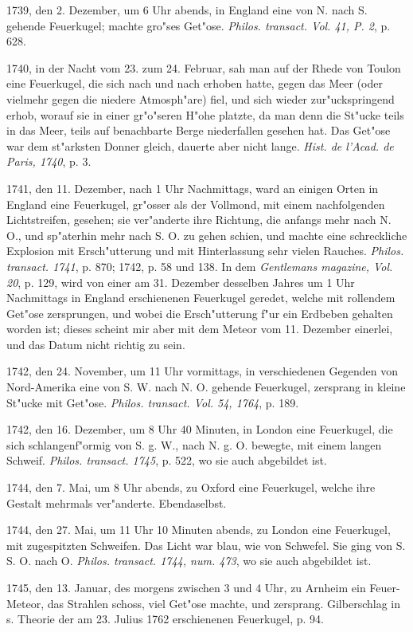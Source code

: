 \documentclass[a4paper, 11pt, oneside, polutonikogreek, german]{article}
\begin{document}
1739, den 2. Dezember, um 6 Uhr abends, in England eine von N. nach S. gehende Feuerkugel; machte gro"ses Get"ose. \emph{Philos. transact. Vol. 41, P. 2}, p. 628.

1740, in der Nacht vom 23. zum 24. Februar, sah man auf der Rhede von Toulon eine Feuerkugel, die sich nach und nach erhoben hatte, gegen das Meer (oder vielmehr gegen die niedere Atmosph"are) fiel, und sich wieder zur"uckspringend erhob, worauf sie in einer gr"o"seren H"ohe platzte, da man denn die St"ucke teils in das Meer, teils auf benachbarte Berge niederfallen gesehen hat. Das Get"ose war dem st"arksten Donner gleich, dauerte aber nicht lange. \emph{Hist. de l'Acad. de Paris, 1740}, p. 3.

1741, den 11. Dezember, nach 1 Uhr Nachmittags, ward an einigen Orten in England eine Feuerkugel, gr"osser als der Vollmond, mit einem nachfolgenden Lichtstreifen, gesehen; sie ver"anderte ihre Richtung, die anfangs mehr nach N. O., und sp"aterhin mehr nach S. O. zu gehen schien, und machte eine schreckliche Explosion mit Ersch"utterung und mit Hinterlassung sehr vielen Rauches. \emph{Philos. transact. 1741}, p. 870; 1742, p. 58 und 138. In dem \emph{Gentlemans magazine, Vol. 20}, p. 129, wird von einer am 31. Dezember desselben Jahres um 1 Uhr Nachmittags in England erschienenen Feuerkugel geredet, welche mit rollendem Get"ose zersprungen, und wobei die Ersch"utterung f"ur ein Erdbeben gehalten worden ist; dieses scheint mir aber mit dem Meteor vom 11. Dezember einerlei, und das Datum nicht richtig zu sein.

1742, den 24. November, um 11 Uhr vormittags, in verschiedenen Gegenden von Nord-Amerika eine von S. W. nach N. O. gehende Feuerkugel, zersprang in kleine St"ucke mit Get"ose. \emph{Philos. transact. Vol. 54, 1764}, p. 189.

1742, den 16. Dezember, um 8 Uhr 40 Minuten, in London eine Feuerkugel, die sich schlangenf"ormig von S. g. W., nach N. g. O. bewegte, mit einem langen Schweif. \emph{Philos. transact. 1745}, p. 522, wo sie auch abgebildet ist.

1744, den 7. Mai, um 8 Uhr abends, zu Oxford eine Feuerkugel, welche ihre Gestalt mehrmals ver"anderte. Ebendaselbst.

1744, den 27. Mai, um 11 Uhr 10 Minuten abends, zu London eine Feuerkugel, mit zugespitzten Schweifen. Das Licht war blau, wie von Schwefel. Sie ging von S. S. O. nach O. \emph{Philos. transact. 1744, num. 473}, wo sie auch abgebildet ist.

1745, den 13. Januar, des morgens zwischen 3 und 4 Uhr, zu Arnheim ein Feuer-Meteor, das Strahlen schoss, viel Get"ose machte, und zersprang. Gilberschlag in s. Theorie der am 23. Julius 1762 erschienenen Feuerkugel, p. 94.
\end{document}
